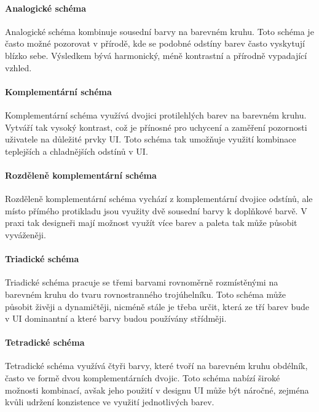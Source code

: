 \paragraph{Analogické schéma} Analogické schéma kombinuje sousední barvy na barevném kruhu. Toto schéma je často možné pozorovat v přírodě, kde se podobné odstíny barev často vyskytují blízko sebe. Výsledkem bývá harmonický, méně kontrastní a přírodně vypadající vzhled. \cite{FigmaColorWheel}

\paragraph{Komplementární schéma} Komplementární schéma využívá dvojici protilehlých barev na barevném kruhu. Vytváří tak vysoký kontrast, což je přínosné pro uchycení a zaměření pozornosti uživatele na důležité prvky UI. Toto schéma tak umožňuje využití kombinace teplejších a chladnějších odstínů v UI. \cite{FigmaColorWheel}

\paragraph{Rozděleně komplementární schéma} Rozděleně komplementární schéma vychází z komplementární dvojice odstínů, ale místo přímého protikladu jsou využity dvě sousední barvy k doplňkové barvě. V praxi tak designeři mají možnost využít více barev a paleta tak může působit vyváženěji. \cite{FigmaColorWheel} \cite{FigmaWhatIsColorTheory}

\paragraph{Triadické schéma} Triadické schéma pracuje se třemi barvami rovnoměrně rozmístěnými na barevném kruhu do tvaru rovnostranného trojúhelníku. Toto schéma může působit živěji a dynamičtěji, nicméně stále je třeba určit, která ze tří barev bude v UI dominantní a které barvy budou používány střídměji. \cite{FigmaColorWheel} 

\paragraph{Tetradické schéma} Tetradické schéma využívá čtyři barvy, které tvoří na barevném kruhu obdélník, často ve formě dvou komplementárních dvojic. Toto schéma nabízí široké možnosti kombinací, avšak jeho použití v designu UI může být náročné, zejména kvůli udržení konzistence ve využití jednotlivých barev. \cite{FigmaColorWheel}


